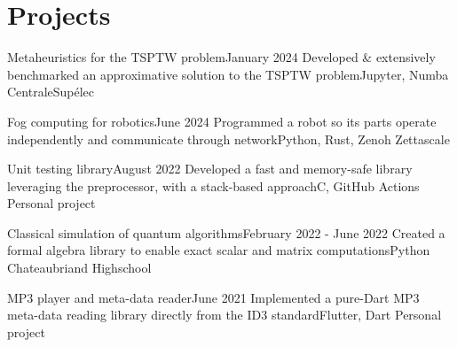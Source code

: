 \section{Projects}
\resumeSubHeadingListStart
    \resumeProjectHeading
    {Metaheuristics for the TSPTW problem}{January 2024}
    {Developed \& extensively benchmarked an approximative solution to the TSPTW problem}{Jupyter, Numba}
    {}
    {CentraleSupélec}

    \resumeProjectHeading
    {Fog computing for robotics}{June 2024}
    {Programmed a robot so its parts operate independently and communicate through network}{Python, Rust, Zenoh}
    {}
    {Zettascale}

    \resumeProjectHeading
    {Unit testing library}{\quad August 2022}
    {Developed a fast and memory-safe library leveraging the preprocessor, with a stack-based approach}{C, GitHub Actions}
    {}
    {Personal project}
    \vspace{-7pt}
    \resumeItemListStart
    \resumeItemListEnd

    \resumeProjectHeading
    {Classical simulation of quantum algorithms}{February 2022 - June 2022}
    {Created a formal algebra library to enable exact scalar and matrix computations}{Python}
    {}
    {Chateaubriand Highschool}
    \vspace{-7pt}
    \resumeItemListStart
    \resumeItemListEnd

    \resumeProjectHeading
    {MP3 player and meta-data reader}{June 2021}
    {Implemented a pure-Dart MP3 meta-data reading library directly from the ID3 standard}{Flutter, Dart}
    {}
    {Personal project}
    \vspace{-7pt}
    \resumeItemListStart
    \resumeItemListEnd


\resumeSubHeadingListEnd

